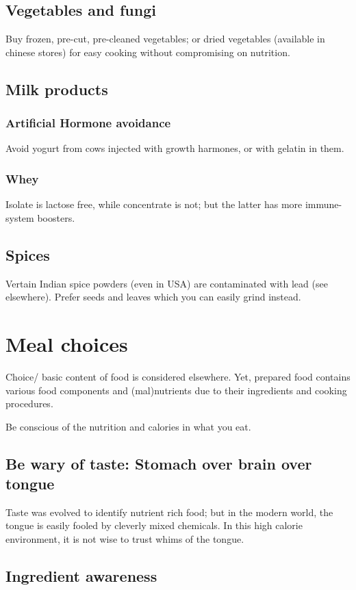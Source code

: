 \documentclass[oneside, article]{memoir}
\begin{document}
\section{Vegetables and fungi}
Buy frozen, pre-cut, pre-cleaned vegetables; or dried vegetables (available in chinese stores) for easy cooking without compromising on nutrition.

\section{Milk products}
\subsection{Artificial Hormone avoidance}
Avoid yogurt from cows injected with growth harmones, or with gelatin in them.

\subsection{Whey}
Isolate is lactose free, while concentrate is not; but the latter has more immune-system boosters.

\section{Spices}
Vertain Indian spice powders (even in USA) are contaminated with lead (see elsewhere). Prefer seeds and leaves which you can easily grind instead.

\chapter{Meal choices}
Choice/ basic content of food is considered elsewhere. Yet, prepared food contains various food components and (mal)nutrients due to their ingredients and cooking procedures.

Be conscious of the nutrition and calories in what you eat. 

\section{Be wary of taste: Stomach over brain over tongue}
Taste was evolved to identify nutrient rich food; but in the modern world, the tongue is easily fooled by cleverly mixed chemicals. In this high calorie environment, it is not wise to trust whims of the tongue.

\section{Ingredient awareness}
\end{document}

